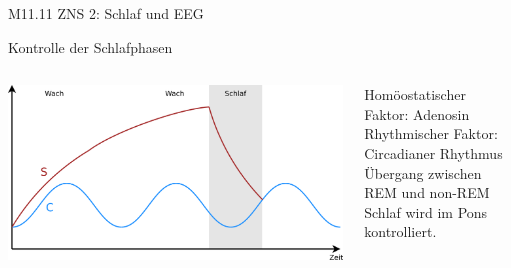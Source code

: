 \documentclass{beamer}
\begin{document}
\begin{frame}{M11.11 ZNS 2: Schlaf und EEG}
\begin{block}{Kontrolle der Schlafphasen}
\begin{columns}[c]
\begin{column}{3cm}
    \begin{center}
        \includegraphics[width=\textwidth]{Zwei-prozess-2.png}
    \end{center}
    
    \end{column}
    
    \begin{column}{8cm}
    Homöostatischer Faktor: Adenosin  \\
    Rhythmischer Faktor: Circadianer Rhythmus \\
    Übergang zwischen REM und non-REM Schlaf wird im Pons kontrolliert. 


    
    \end{column}
    
    \end{columns}
    



    
    
    \end{block}
    
\end{frame}
\end{document}
